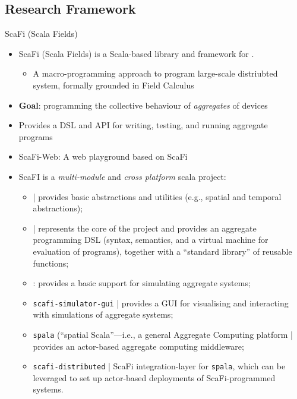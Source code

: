 \documentclass[presentation, 9pt]{beamer}\mode<presentation>{\usetheme{AMSBolognaFC}}
\begin{document}
\subsection{Research Framework}
\begin{frame}{ScaFi (Scala Fields)}
\begin{itemize}
	\item ScaFi (Scala Fields) is a Scala-based library and framework for .
	\begin{itemize}
		\item A macro-programming approach to program large-scale distriubted system, formally grounded in Field Calculus
	\end{itemize}
	\item \textbf{Goal}: programming the collective behaviour of \emph{aggregates} of devices
 	\item Provides a DSL and API for writing, testing, and running aggregate programs
  \item ScaFi-Web: A web playground based on ScaFi \href{https://scafi.github.io/web/}{\faLink}
	\item ScaFI is a \emph{multi-module} and \emph{cross platform} scala project:
	\begin{itemize}
		\item \texttt{} | provides basic abstractions and utilities (e.g., spatial and temporal abstractions);
		\item \texttt{} | represents the core of the project and provides an aggregate programming DSL (syntax, semantics, and a virtual machine for evaluation of programs), together with a ``standard library'' of reusable functions;
		\item \texttt{}: provides a basic support for simulating aggregate systems;
		\item \texttt{scafi-simulator-gui} | provides a GUI for visualising and interacting with simulations of aggregate systems;
		\item \texttt{spala} (``spatial Scala''---i.e., a general Aggregate Computing platform | provides an actor-based aggregate computing middleware;
		\item \texttt{scafi-distributed} |  ScaFi integration-layer for \texttt{spala}, which can be leveraged to set up actor-based deployments of ScaFi-programmed systems.
		\end{itemize}
\end{itemize}


\end{frame}
\end{document}
